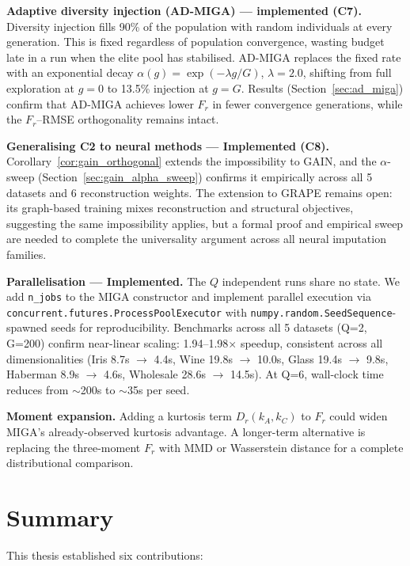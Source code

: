 \textbf{Adaptive diversity injection (AD-MIGA) --- implemented (C7).} Diversity injection fills 90\% of the population with random individuals at every generation. This is fixed regardless of population convergence, wasting budget late in a run when the elite pool has stabilised. AD-MIGA replaces the fixed rate with an exponential decay $\alpha(g) = \exp(-\lambda g/G)$, $\lambda=2.0$, shifting from full exploration at $g=0$ to 13.5\% injection at $g=G$. Results (Section~\ref{sec:ad_miga}) confirm that AD-MIGA achieves lower $F_r$ in fewer convergence generations, while the $F_r$--RMSE orthogonality remains intact.

\textbf{Generalising C2 to neural methods --- Implemented (C8).} Corollary~\ref{cor:gain_orthogonal} extends the impossibility to GAIN, and the $\alpha$-sweep (Section~\ref{sec:gain_alpha_sweep}) confirms it empirically across all 5 datasets and 6 reconstruction weights. The extension to GRAPE \cite{You2020} remains open: its graph-based training mixes reconstruction and structural objectives, suggesting the same impossibility applies, but a formal proof and empirical sweep are needed to complete the universality argument across all neural imputation families.

\textbf{Parallelisation --- Implemented.} The $Q$ independent runs share no state. We add \texttt{n\_jobs} to the MIGA constructor and implement parallel execution via \texttt{concurrent.futures.ProcessPoolExecutor} with \texttt{numpy.random.SeedSequence}-spawned seeds for reproducibility. Benchmarks across all 5 datasets (Q=2, G=200) confirm near-linear scaling: 1.94--1.98$\times$ speedup, consistent across all dimensionalities (Iris 8.7s $\to$ 4.4s, Wine 19.8s $\to$ 10.0s, Glass 19.4s $\to$ 9.8s, Haberman 8.9s $\to$ 4.6s, Wholesale 28.6s $\to$ 14.5s). At Q=6, wall-clock time reduces from $\sim$200s to $\sim$35s per seed.

\textbf{Moment expansion.} Adding a kurtosis term $D_r(k_A, k_C)$ to $F_r$ could widen MIGA's already-observed kurtosis advantage. A longer-term alternative is replacing the three-moment $F_r$ with MMD or Wasserstein distance for a complete distributional comparison.

\section{Summary}

This thesis established six contributions:

